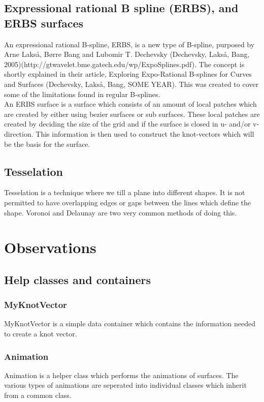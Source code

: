 \documentclass[a4paper,11pt]{article}
\begin{document}
\subsection{Expressional rational B spline (ERBS), and ERBS surfaces}
An expressional rational B-spline, ERBS, is a new type of B-spline, purposed by Arne Lakså, Børre Bang and Lubomir T. Dechevsky (Dechevsky, Lakså, Bang, 2005)(http://gtwavelet.bme.gatech.edu/wp/ExpoSplines.pdf). The concept is shortly explained in their article, Exploring Expo-Rational B-splines for Curves and Surfaces (Dechevsky, Lakså, Bang, SOME YEAR). This was created to cover some of the limitations found in regular B-splines.\\

An ERBS surface is a surface which consists of an amount of local patches which are created by either using bezier surfaces or sub surfaces. These local patches are created by deciding the size of the grid and if the surface is closed in u- and/or v-direction. This information is then used to construct the knot-vectors which will be the basis for the surface. 

\subsection{Tesselation}
Tesselation is a technique where we till a plane into different shapes. It is not permitted to have overlapping edges or gaps between the lines which define the shape. Voronoi and Delaunay are two very common methods of doing this. \\

\section{Observations}
\subsection{Help classes and containers}
\subsubsection{MyKnotVector}
MyKnotVector is a simple data container which contains the information needed to create a knot vector. 


\subsubsection{Animation}
Animation is a helper class which performs the animations of surfaces. The various types of animations are seperated into individual classes which inherit from a common class. 
\end{document}
